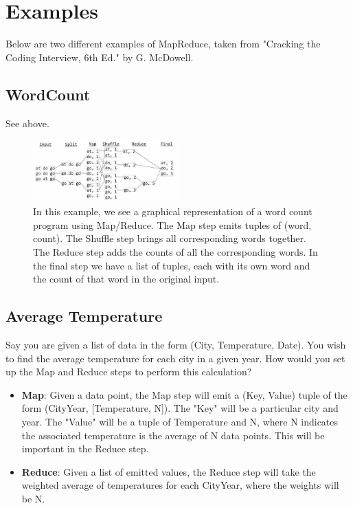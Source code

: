 \newpage

\section{Examples} 
Below are two different examples of MapReduce, taken from "Cracking the Coding Interview, 6th Ed." by G. McDowell. 
	\subsection{WordCount} 
	See above.
	\begin{figure}[]
		\begin{center} 
			\includegraphics[width=0.5\textwidth]{figures/MR_1.png}
			\caption{In this example, we see a graphical representation of a word count program using Map/Reduce. The Map step emits tuples of (word, count). The Shuffle step brings all corresponding words together. The Reduce step adds the counts of all the corresponding words. In the final step we have a list of tuples, each with its own word and the count of that word in the original input.}
		\end{center}
	\end{figure}

	\subsection{Average Temperature}
	Say you are given a list of data in the form (City, Temperature, Date). You wish to find the average temperature for each city in a given year. How would you set up the Map and Reduce steps to perform this calculation? 
	
	\begin{itemize}
	\item \textbf{Map}: Given a data point, the Map step will emit a (Key, Value) tuple of the form (CityYear, [Temperature, N]). The "Key" will be a particular city and year. The "Value" will be a tuple of Temperature and N, where N indicates the associated temperature is the average of N data points. This will be important in the Reduce step. 
	\item \textbf{Reduce}: Given a list of emitted values, the Reduce step will take the weighted average of temperatures for each CityYear, where the weights will be N.
\end{itemize}	